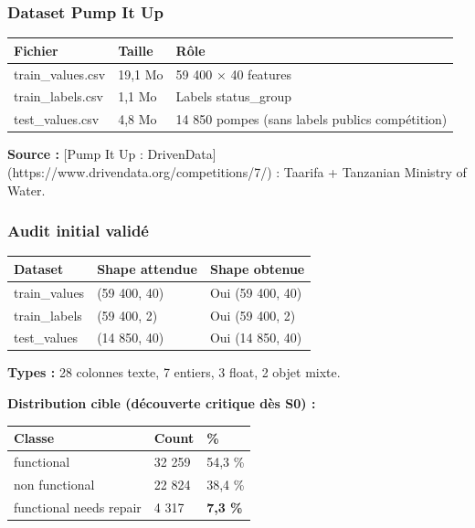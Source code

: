 \documentclass[11pt,a4paper]{report}
\begin{document}
\subsubsection{Dataset Pump It Up}



\begin{longtable}{@{}lll@{}}
\toprule
Fichier & Taille & Rôle \\
\midrule
train\_values.csv & 19,1 Mo & 59 400 × 40 features \\
train\_labels.csv & 1,1 Mo & Labels status\_group \\
test\_values.csv & 4,8 Mo & 14 850 pompes (sans labels publics compétition) \\
\bottomrule
\end{longtable}




\textbf{Source :} [Pump It Up : DrivenData](https://www.drivendata.org/competitions/7/) : Taarifa + Tanzanian Ministry of Water.



\subsubsection{Audit initial validé}



\begin{longtable}{@{}lll@{}}
\toprule
Dataset & Shape attendue & Shape obtenue \\
\midrule
train\_values & (59 400, 40) & Oui (59 400, 40) \\
train\_labels & (59 400, 2) & Oui (59 400, 2) \\
test\_values & (14 850, 40) & Oui (14 850, 40) \\
\bottomrule
\end{longtable}




\textbf{Types :} 28 colonnes texte, 7 entiers, 3 float, 2 objet mixte.



\textbf{Distribution cible (découverte critique dès S0) :}



\begin{longtable}{@{}lll@{}}
\toprule
Classe & Count & \% \\
\midrule
functional & 32 259 & 54,3 \% \\
non functional & 22 824 & 38,4 \% \\
functional needs repair & 4 317 & \textbf{7,3 \%} \\
\bottomrule
\end{longtable}
\end{document}
